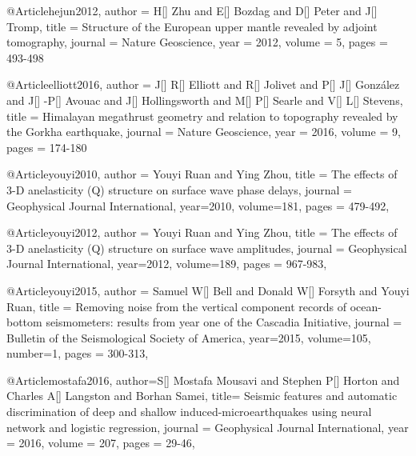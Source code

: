 @Article{hejun2012,
  author = 	 {H[] Zhu and E[] Bozdag and D[] Peter and J[] Tromp},
  title = 	 {Structure of the European upper mantle revealed by adjoint tomography},
  journal = 	 {Nature Geoscience},
  year = 	 2012,
  volume = 5,
  pages =	 {493-498}
}

@Article{elliott2016,
  author = 	 {J[] R[] Elliott and R[] Jolivet and P[] J[] Gonz\'{a}lez and J[] -P[] Avouac and J[] Hollingsworth and M[] P[] Searle and V[] L[] Stevens},
  title = 	 {Himalayan megathrust geometry and relation to topography revealed by the {G}orkha earthquake},
  journal = 	 {Nature Geoscience},
  year = 	 2016,
  volume = 9,
  pages =	 {174-180}
}

@Article{youyi2010,
  author =	 {Youyi Ruan and Ying Zhou},
  title =	 {The effects of 3-D anelasticity (Q) structure on surface wave phase delays},
  journal =	 {Geophysical Journal International},
  year=2010,
  volume=181,
  pages =	 {479-492},
}

@Article{youyi2012,
  author =	 {Youyi Ruan and Ying Zhou},
  title =	 {The effects of 3-D anelasticity (Q) structure on surface wave amplitudes},
  journal =	 {Geophysical Journal International},
  year=2012,
  volume=189,
  pages =	 {967-983},
}

@Article{youyi2015,
  author =	 {Samuel W[] Bell and Donald W[] Forsyth and Youyi Ruan},
  title =	 {Removing noise from the vertical component records of ocean-bottom seismometers: results from year one of the Cascadia Initiative},
  journal =	 {Bulletin of the Seismological Society of America},
  year=2015,
  volume=105,
  number=1,
  pages =	 {300-313},
}


@Article{mostafa2016,
  author={S[] Mostafa Mousavi and Stephen P[] Horton and Charles A[] Langston and Borhan Samei},
  title={ Seismic features and automatic discrimination of deep and shallow induced-microearthquakes using neural network and logistic regression},
  journal = 	 {Geophysical Journal International},
  year = 	 2016,
  volume =	 207,
  pages =	 {29-46},
}





